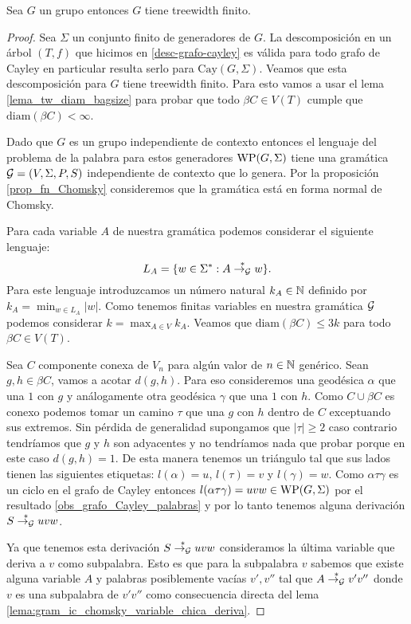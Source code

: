 \documentclass[tesis.tex]{subfiles}
\begin{document}
\begin{teo} \label{teo_ic_implica_tw}\cite{muller1985theory}
	Sea $G$ un grupo \ic entonces $G$ tiene treewidth finito.
\end{teo}
\begin{proof}
	Sea $\Sigma$ un conjunto finito de generadores de $G$.
	La descomposición en un árbol $(T,f)$ que hicimos en \ref{desc-grafo-cayley} es válida para todo grafo de Cayley en particular resulta serlo para $\text{Cay}(G,\Sigma)$.
	Veamos que esta descomposición para $G$ tiene treewidth finito. 
	Para esto vamos a usar el lema \ref{lema_tw_diam_bagsize} para probar que todo $\beta C \in V(T)$ cumple que $\text{diam}(\beta C) < \infty$.
	
	
	Dado que $G$ es un grupo independiente de contexto entonces el lenguaje del problema de la palabra para estos generadores $\text{WP}(G, \Sigma)$ tiene una gramática $ {\cal G} = (V, \Sigma, P, S)$ independiente de contexto que lo genera. 
	Por la proposición \ref{prop_fn_Chomsky} consideremos que la gramática está en forma normal de Chomsky.
	
	Para cada variable $A$ de nuestra gramática podemos considerar el siguiente lenguaje:
	\[
	L_A = \{ w \in \Sigma^* : A \overset{*}{\to_{\cal G}} w  \}.
	\]
	Para este lenguaje introduzcamos un número natural $k_A \in \mathbb{N}$ definido por $k_A = {\min}_{w \in L_A} |w|$. 
	Como tenemos finitas variables en nuestra gramática $\cal G$ podemos considerar $k = \max_{A \in V} k_A$. 
	Veamos que $\text{diam}(\beta C) \le 3k$ para todo $\beta C \in V(T)$.
	
	Sea $C$ componente conexa de $V_{n}$ para algún valor de $n \in \mathbb{N}$ genérico.
	Sean $g,h \in \beta C$, vamos a acotar $d(g,h)$. 
	Para eso consideremos una geodésica $\alpha$ que una $1$ con $g$ y análogamente otra geodésica $\gamma$ que una $1$ con $h$. 
	Como $C \cup \beta C$ es conexo podemos tomar un camino $\tau$ que una $g$ con $h$ dentro de $C$ exceptuando sus extremos. 
	Sin pérdida de generalidad supongamos que $|\tau| \ge 2$ caso contrario tendríamos que $g$ y $h$ son adyacentes y no tendríamos nada que probar porque en este caso $d(g,h) =1$.
	De esta manera tenemos un triángulo tal que sus lados tienen las siguientes etiquetas:
	$l(\alpha) = u $, $l(\tau) =v$ y $l(\gamma) = w$.
	Como $\alpha \tau \gamma$ es un ciclo en el grafo de Cayley entonces $l(\alpha \tau \gamma) = uvw \in  \text{WP}(G, \Sigma)$ por el resultado \ref{obs_grafo_Cayley_palabras} y por lo tanto tenemos alguna derivación $S \overset{*}{\to_{\cal G}} uvw$.
	
	Ya que tenemos esta derivación $S \overset{*}{\to_{\cal G}} uvw$ consideramos la última variable que deriva a $v$ como subpalabra. 
	Esto es que para la subpalabra $v$ sabemos que existe alguna variable $A$ y palabras posiblemente vacías $v',v''$ tal que $A \overset{*}{\to_{\cal G}} v'v''$ donde $v$ es una subpalabra de $v'v''$ como consecuencia directa del lema \ref{lema:gram_ic_chomsky_variable_chica_deriva}.
	

\end{proof}
\end{document}
